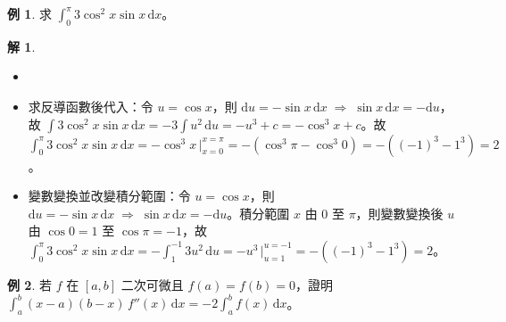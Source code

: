 \documentclass[12pt]{extarticle}
\newcommand{\ds}{\displaystyle}
\newcommand{\ie}{\;\Longrightarrow\;}
\theoremstyle{definition}
\newtheorem*{ex}{例}
\newtheorem*{sol}{解}
\begin{document}
\begin{ex}
  求 $\ds\int_0^{\pi}3\cos^2 x\sin x\,\text{d}x$。
\end{ex}

\begin{sol}
  \begin{itemize}\setlength{\itemsep}{0pt}
    \item[]
    \item 求反導函數後代入：令 $\ds u = \cos x$，則 $\ds\text{d}u = -\sin x\,\text{d}x\ie \sin x\,\text{d}x = -\text{d}u$，故 $\ds\int3\cos^2 x\sin x\,\text{d}x = -3\int u^2\,\text{d}u = -u^3 + c = -\cos^3 x + c$。故 $\ds\int_0^{\pi}3\cos^2 x\sin x\,\text{d}x = -\cos^3 x\,\Big|_{x = 0}^{x = \pi} = -(\cos^3\pi - \cos^3 0) = -((-1)^3 - 1^3) = 2$。
    \item 變數變換並改變積分範圍：令 $\ds u = \cos x$，則 $\ds\text{d}u = -\sin x\,\text{d}x\ie \sin x\,\text{d}x = -\text{d}u$。積分範圍 $x$ 由 $0$ 至 $\pi$，則變數變換後 $u$ 由 $\ds\cos 0 = 1$ 至 $\ds\cos\pi= -1$，故 $\ds\int_0^{\pi}3\cos^2 x\sin x\,\text{d}x = -\int_{1}^{-1}3u^2\,\text{d}u = -u^3\,\Big|_{u = 1}^{u = -1} = -((-1)^3 - 1^3) = 2$。
  \end{itemize}
\end{sol}

\begin{ex}
  若 $f$ 在 $[a, b]$ 二次可微且 $f(a) = f(b) = 0$，證明 $\ds\int_a^b\!(x-a)(b-x)\,f''(x)\,\mathrm{d}x = -2\int_a^b\!f(x)\,\mathrm{d}x$。
\end{ex}
\end{document}
